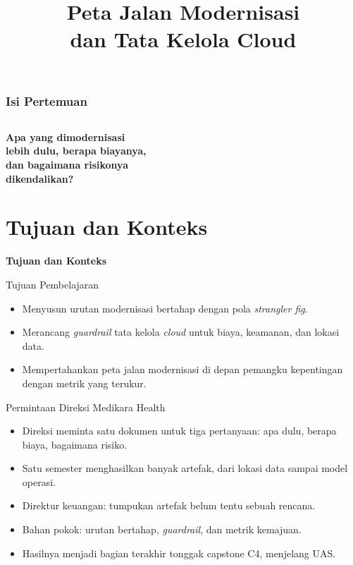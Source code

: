 \documentclass[aspectratio=169, table, 12pt]{beamer}
\title{\Huge Peta Jalan Modernisasi\\ \vspace{10pt} dan Tata Kelola Cloud}
\begin{document}
\frame{\titlepage}

\begin{frame}
  \frametitle{Isi Pertemuan}
  \vspace{14pt}
  \begin{columns}[t]
    {\small\tableofcontents[sections={1-4}]}

    {\small\tableofcontents[sections={5-8}]}
  \end{columns}
\end{frame}

\begin{frame}{\hfill}
  \centering
  \Huge{\textbf{Apa yang dimodernisasi\\lebih dulu, berapa biayanya,\\dan bagaimana risikonya\\dikendalikan?}}
\end{frame}

\section{Tujuan dan Konteks}

\begin{frame}{\hfill}
  \centering
  \Huge{\textbf{Tujuan dan Konteks}}
\end{frame}

\begin{frame}{{\Large Tujuan Pembelajaran}}
  \vspace{10pt}
  \begin{itemize}
    \item Menyusun urutan modernisasi bertahap dengan pola \textit{strangler fig}.
    \item Merancang \textit{guardrail} tata kelola \textit{cloud} untuk biaya, keamanan, dan lokasi
          data.
    \item Mempertahankan peta jalan modernisasi di depan pemangku kepentingan dengan metrik yang
          terukur.
  \end{itemize}
\end{frame}

\begin{frame}{{\Large Permintaan Direksi Medikara Health}}
  \vspace{10pt}
  \begin{itemize}
    \item Direksi meminta satu dokumen untuk tiga pertanyaan: apa dulu, berapa biaya, bagaimana
          risiko.
    \item Satu semester menghasilkan banyak artefak, dari lokasi data sampai model operasi.
    \item Direktur keuangan: tumpukan artefak belum tentu sebuah rencana.
    \item Bahan pokok: urutan bertahap, \textit{guardrail}, dan metrik kemajuan.
    \item Hasilnya menjadi bagian terakhir tonggak capstone C4, menjelang UAS.
  \end{itemize}
\end{frame}
\end{document}

